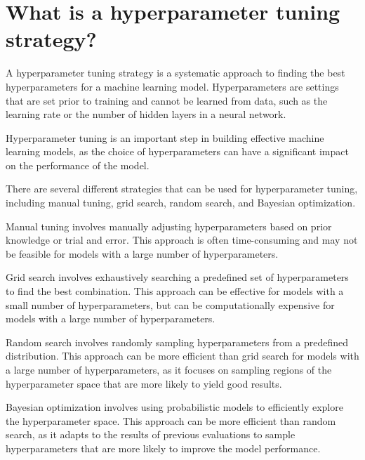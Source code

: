 \section{What is a hyperparameter tuning strategy?}
A hyperparameter tuning strategy is a systematic approach to finding the best hyperparameters for a machine learning model. Hyperparameters are settings that are set prior to training and cannot be learned from data, such as the learning rate or the number of hidden layers in a neural network.

Hyperparameter tuning is an important step in building effective machine learning models, as the choice of hyperparameters can have a significant impact on the performance of the model.

There are several different strategies that can be used for hyperparameter tuning, including manual tuning, grid search, random search, and Bayesian optimization.

Manual tuning involves manually adjusting hyperparameters based on prior knowledge or trial and error. This approach is often time-consuming and may not be feasible for models with a large number of hyperparameters.

Grid search involves exhaustively searching a predefined set of hyperparameters to find the best combination. This approach can be effective for models with a small number of hyperparameters, but can be computationally expensive for models with a large number of hyperparameters.

Random search involves randomly sampling hyperparameters from a predefined distribution. This approach can be more efficient than grid search for models with a large number of hyperparameters, as it focuses on sampling regions of the hyperparameter space that are more likely to yield good results.

Bayesian optimization involves using probabilistic models to efficiently explore the hyperparameter space. This approach can be more efficient than random search, as it adapts to the results of previous evaluations to sample hyperparameters that are more likely to improve the model performance.

